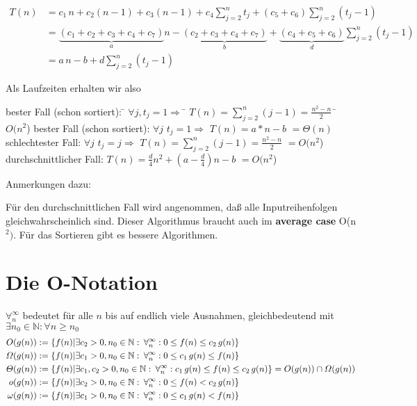 \documentclass[ngerman]{scrreprt}%
\theoremstyle{break}
\begin{document}
\begin{align*}
  T(n) &= c_1\,n + c_2(n-1) + c_3(n-1) + c_4\sum_{j=2}^{n}t_j
     + (c_5+c_6)\sum_{j=2}^{n}(t_j-1)\\
  &=\underbrace{(c_1+c_2+c_3+c_4+c_7)}_{a}n -
     \underbrace{(c_2+c_3+c_4+c_7)}_{b} +
     \underbrace{(c_4+c_5+c_6)}_{d}\sum_{j=2}^{n}(t_j-1)\\
  &=  a\,n-b+d\sum_{j=2}^{n}(t_j-1)
\end{align*}

Als Laufzeiten erhalten wir also
\begin{tabbing}
bester Fall (schon sortiert): \= $ \forall j,t_j=1 \Rightarrow$ \= $T(n)=\sum_{j=2}^{n}(j-1)= \frac {n^2-n}{2}\,$ \= $O(n^2$) \kill
bester Fall (schon sortiert): \> $ \forall j\,\,t_j=1 \Rightarrow$ \> $T(n)=a*n-b$ \> $=\Theta(n)$ \\ 
schlechtester Fall: \> $ \forall j\,\,t_j=j \Rightarrow$ \> $T(n)=\sum_{j=2}^{n}(j-1)= \frac {n^2-n}{2}$ \> $=O(n^2$)\\
durchschnittlicher Fall: \> \> $T(n)=\frac{d}{4}n^2+(a-\frac{d}{4})n-b$ \> $=O(n^2$)
\end{tabbing}

\noindent Anmerkungen dazu:

Für den durchschnittlichen Fall wird angenommen, daß alle
Inputreihenfolgen gleichwahrscheinlich sind.
Dieser Algorithmus braucht auch im \textbf{average case} O(n$^2)$. Für das Sortieren gibt es
bessere Algorithmen.

\section{Die O-Notation}
$\forall_n^\infty$ bedeutet für alle $n$ bis auf endlich viele
Ausnahmen, gleichbedeutend mit $\exists n_0 \in \mathbb{N}: \forall n\geq n_0$
\begin{align*}
  O(g(n)) &:= \{ f(n) | \exists c_2 > 0, n_0 \in \mathbb{N}:\:
    \forall_n^\infty: 0\leq f(n)\leq c_2\,g(n)\}\\
  \Omega(g(n)) &:= \{ f(n) | \exists{}c_1 > 0, n_0 \in  \mathbb{N}:\:
    \forall_n^\infty: 0\leq c_1\,g(n)\leq f(n) 
    \} \\
  \Theta(g(n)) &:= \{ f(n) | \exists c_1, c_2 > 0, n_0 \in \mathbb{N}:\: 
    \forall_n^\infty: c_1\,g(n)\leq f(n)\leq c_2\,g(n)\} =
    \hfill O(g(n)) \cap \Omega(g(n))\\
o(g(n)) &:= \{ f(n) | \exists c_2 > 0, n_0 \in \mathbb{N}:\:
    \forall_n^\infty: 0\leq f(n)< c_2\,g(n)\}\\
\omega(g(n)) &:= \{ f(n) | \exists{}c_1 > 0, n_0 \in  \mathbb{N}:\:
    \forall_n^\infty: 0\leq c_1\,g(n)< f(n) 
    \}
\end{align*} 
\end{document}

